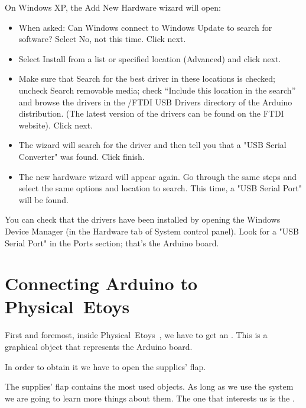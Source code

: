 \documentclass[english]{etoys-guide}
\def\appName{Physical~Etoys~}
\begin{document}
On Windows XP, the Add New Hardware wizard will open:

\begin{itemize}
	
	\item When asked: Can Windows connect to Windows Update to search for
	software? Select No, not this time. Click next.

	\item Select Install from a list or specified location (Advanced) and click
	next.

	\item Make sure that Search for the best driver in these locations is
	checked; uncheck Search removable media; check “Include this location in
	the search” and browse the drivers in the /FTDI USB Drivers directory of
	the Arduino distribution. (The latest version of the drivers can be found
	on the FTDI website). Click next.

	\item The wizard will search for the driver and then tell you that a "USB
	Serial Converter" was found. Click finish.

	\item The new hardware wizard will appear again. Go through the same steps
	and select the same options and location to search. This time, a "USB
	Serial Port" will be found.

\end{itemize}

You can check that the drivers have been installed by opening the Windows
Device Manager (in the Hardware tab of System control panel). Look for a "USB
Serial Port" in the Ports section; that's the Arduino board.


\section{Connecting Arduino to \appName}

First and foremost, inside \appName, we have to get an .
This is a graphical object that represents the Arduino board. 

In order to obtain it we have to open the supplies' flap.


The supplies' flap contains the most used objects.  As long as we use the
system we are going to learn more things about them. The one that interests us
is the .
\end{document}
